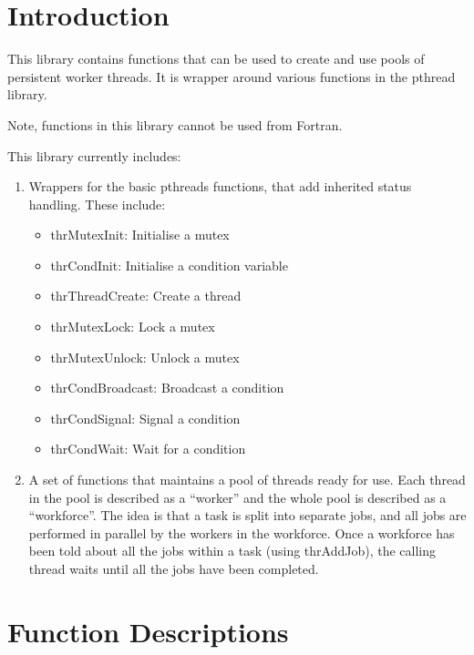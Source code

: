 \documentclass[11pt,nolof]{starlink}
\begin{document}
\scfrontmatter

\section {Introduction}

This library contains functions that can be used to create and use pools
of persistent worker threads. It is wrapper around various functions in
the pthread library.

Note, functions in this library cannot be used from Fortran.

This library currently includes:
\begin{enumerate}
\item Wrappers for the basic pthreads functions, that add
inherited status handling. These include:

\begin{itemize}
\item thrMutexInit: Initialise a mutex
\item thrCondInit: Initialise a condition variable
\item thrThreadCreate: Create a thread
\item thrMutexLock: Lock a mutex
\item thrMutexUnlock: Unlock a mutex
\item thrCondBroadcast: Broadcast a condition
\item thrCondSignal: Signal a condition
\item thrCondWait: Wait for a condition
\end {itemize}

\item A set of functions that maintains a pool of threads ready for
use. Each thread in the pool is described as a ``worker'' and the
whole pool is described as a ``workforce''. The idea is that a task is
split into separate jobs, and all jobs are performed in parallel by
the workers in the workforce. Once a workforce has been told about all
the jobs within a task (using thrAddJob), the calling thread waits
until all the jobs have been completed.

\end{enumerate}

\appendix
\section{\label{APP:SPEC}Function Descriptions}

\small
\end{document}
